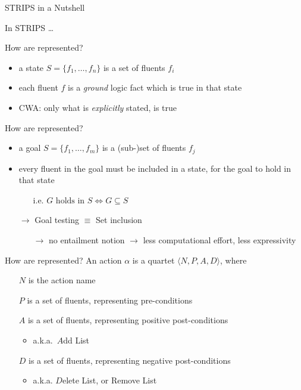 \documentclass[presentation]{beamer}\mode<presentation>{\usetheme{AMSBolognaFC}}
\begin{document}
\begin{frame}[allowframebreaks]{STRIPS in a Nutshell}

In STRIPS \ldots

\begin{block}{How are  represented?}
	\begin{itemize}
		\item a state $S = \{ f_1, \ldots, f_n\}$ is a \alert{set} of \alert{fluents} $f_i$
		\item each fluent $f$ is a \emph{ground} logic \alert{fact} which is true in that state
		\item CWA: only what is \emph{explicitly} stated, is true
	\end{itemize}
\end{block}

\begin{block}{How are  represented?}
	\begin{itemize}
		\item a goal $S = \{ f_1, \ldots, f_m\}$ is a \alert{(sub-)set} of \alert{fluents} $f_j$
		\item every fluent in the goal must be \alert{included} in a state, for the goal to hold in that state
		\begin{itemize}
			\item[i.e.] $G \text{ holds in } S \Leftrightarrow G \subseteq S$
		\end{itemize}
		\item[$\rightarrow$] Goal testing $\equiv$ Set inclusion
		\begin{itemize}
			\item[$\rightarrow$] no entailment notion $\rightarrow$ less computational effort, less expressivity
		\end{itemize}
	\end{itemize}
\end{block}

\framebreak

\begin{block}{How are  represented?}
	An action $\alpha$ is a quartet $\langle N, P, A, D \rangle$, where
	\begin{itemize}
		\item[$N$] is the action name
		\item[$P$] is a set of fluents, representing \alert{pre}-conditions
		\item[$A$] is a set of fluents, representing \alert{positive post}-conditions
		\begin{itemize}
			\item a.k.a.\ $A$dd List
		\end{itemize}
		\item[$D$] is a set of fluents, representing \alert{negative post}-conditions
		\begin{itemize}
			\item a.k.a. $D$elete List, or Remove List
		\end{itemize}
	\end{itemize}
\end{block}


\end{frame}
\end{document}
